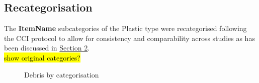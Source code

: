 \documentclass[10pt]{article}\usepackage[]{graphicx}\usepackage[]{color}
\begin{document}
\pagebreak
\subsection{Recategorisation}\label{recategorisation}

The \textbf{ItemName} subcategories of the Plastic type were recategorised following the CCI protocol to allow for consistency and comparability across studies as has been discussed in \hyperref[research]{Section 2}.\\

\hl{show original categories?}\\





\begin{figure}[H] 
\begin{center}

\caption {Debris by categorisation}
\label{figE}
\end {center}
\end {figure}
\end{document}
